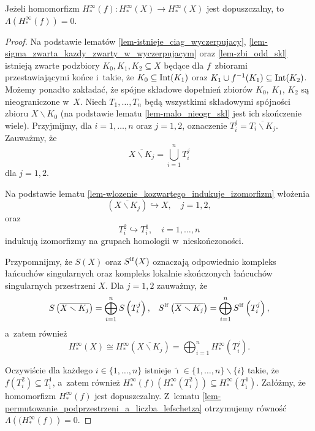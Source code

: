 \begin{stw}\label{stw-indukowany_na_homologiach_w_nieskonczonosci_ma_zerowa_liczbe_lefschetza}
Jeżeli homomorfizm $H^\infty_*(f)\colon H^\infty_*(X)\to H^\infty_*(X)$ jest dopuszczalny, to $\Lambda\left(H_*^\infty(f)\right)=0$.
\end{stw}
\begin{proof}
Na podstawie lematów \ref{lem-istnieje_ciag_wyczerpujacy}, \ref{lem-sigma_zwarta_kazdy_zwarty_w_wyczerpujacym} oraz \ref{lem-zbi_odd_skl} istnieją zwarte podzbiory $K_0, K_1, K_2\subseteq X$ będące dla $f$~zbiorami przestawiającymi końce i~takie, że $K_0\subseteq\operatorname{Int}(K_1)$ oraz $K_1\cup f^{-1}(K_1)\subseteq\operatorname{Int}(K_2)$. Możemy ponadto zakładać, że spójne składowe dopełnień zbiorów $K_0$, $K_1$, $K_2$ są nieograniczone w~$X$. Niech $T_1,\ldots,T_n$ będą wszystkimi składowymi spójności zbioru $X\smallsetminus K_0$ (na podstawie lematu \ref{lem-malo_nieogr_skl} jest ich skończenie wiele). Przyjmijmy, dla $i=1,\ldots,n$ oraz $j=1,2$, oznaczenie  $T_i^j=\overline{T_i\smallsetminus K_j}$. Zauważmy, że \[\overline{X\smallsetminus K_j}=\bigcup_{i=1}^{n} T_i^j\] dla $j=1,2$.

Na podstawie lematu \ref{lem-wlozenie_kozwartego_indukuje_izomorfizm} włożenia \[\left(\overline{X\smallsetminus K_j}\right)\hookrightarrow X,\quad j=1,2,\] oraz \[T_i^2\hookrightarrow T_i^1,\quad i=1,\ldots,n\]
indukują izomorfizmy na grupach homologii w~nieskończoności.

Przypomnijmy, że $S(X)$ oraz $S^{\mathrm{lf}}(X)$ oznaczają odpowiednio kompleks łańcuchów singularnych oraz kompleks lokalnie skończonych łańcuchów singularnych przestrzeni $X$. Dla $j=1,2$ zauważmy, że 
\begin{align*}
S\left(\overline{X\smallsetminus K_j}\right)=\bigoplus_{i=1}^{n}S\left(T_i^j\right), & & S^{\mathrm{lf}}\left(\overline{X\smallsetminus K_j}\right)=\bigoplus_{i=1}^{n}S^{\mathrm{lf}}\left(T_i^j\right),
\end{align*}
a~zatem również
\[H_*^\infty(X)\cong H_*^\infty\left(\overline{X\smallsetminus K_j}\right)=\bigoplus_{i=1}^{n}H_*^\infty\left(T_i^j\right).\]

Oczywiście dla każdego $i\in\{1,\ldots,n\}$ istnieje $\tilde{\imath}\in \{1,\ldots,n\}\smallsetminus\{i\}$ takie, że $f\left(T_i^2\right)\subseteq T_{\tilde{\imath}}^1$, a~zatem również $H_*^\infty(f)\left(H_*^\infty\left(T_i^2\right)\right)\subseteq H_*^\infty\left(T_{\tilde{\imath}}^1\right)$. Załóżmy, że homomorfizm $H_*^\infty(f)$ jest dopuszczalny. Z~lematu \ref{lem-permutowanie_podprzestrzeni_a_liczba_lefschetza} otrzymujemy równość $\Lambda\left((H_*^\infty(f)\right)=0$.
\end{proof}

